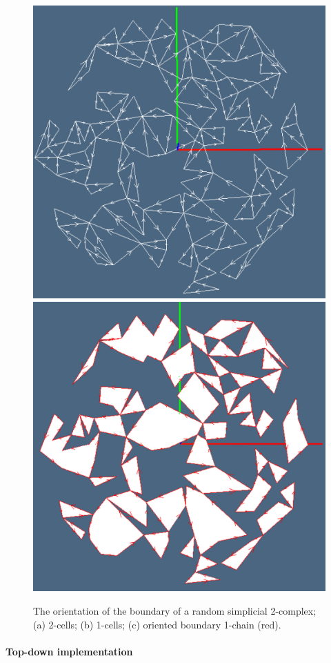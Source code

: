 \documentclass[11pt,oneside]{article}    %
\begin{document}
\begin{figure}[htbp]
   \includegraphics[height=0.328\linewidth,width=0.328\linewidth]{images/randomdelaunay2} 
   \includegraphics[height=0.328\linewidth,width=0.328\linewidth]{images/randomdelaunay3} 
   \caption{The orientation of the boundary of a random simplicial 2-complex;
   (a) 2-cells; (b) 1-cells; (c) oriented boundary 1-chain (red).}
   \label{randomdelaunay}
\end{figure}


\paragraph{Top-down implementation}
\end{document}
